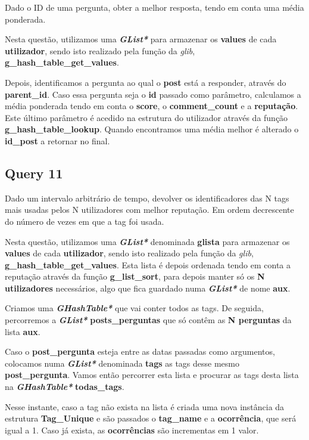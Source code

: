 \documentclass[a4paper]{article}
\begin{document}
Dado o ID de uma pergunta, obter a melhor resposta, tendo em conta
uma média ponderada.

Nesta questão, utilizamos uma \textit{\textbf{GList*}} para armazenar 
os \textbf{values} de cada \textbf{utilizador}, sendo isto realizado
pela função da \textit{glib}, \textbf{g\_hash\_table\_get\_values}.

Depois, identificamos a pergunta ao qual o \textbf{post} está a responder,
através do \textbf{parent\_id}. Caso essa pergunta seja o \textbf{id}
passado como parâmetro, calculamos a média ponderada tendo em conta o
\textbf{score}, o \textbf{comment\_count} e a \textbf{reputação}. Este
último parâmetro é acedido na estrutura do utilizador através da função
\textbf{g\_hash\_table\_lookup}. Quando encontramos uma média melhor é
alterado o \textbf{id\_post} a retornar no final.

\subsection{Query 11}

Dado um intervalo arbitrário de tempo, devolver os identificadores das N tags
mais usadas pelos N utilizadores com melhor reputação. Em ordem decrescente 
do número de vezes em que a tag foi usada.

Nesta questão, utilizamos uma \textit{\textbf{GList*}} denominada 
\textbf{glista} para armazenar os \textbf{values} de cada \textbf{utilizador},
sendo isto realizado pela função da \textit{glib}, 
\textbf{g\_hash\_table\_get\_values}. Esta lista é depois ordenada tendo em
conta a reputação através da função \textbf{g\_list\_sort}, para depois 
manter só os \textbf{N utilizadores} necessários, algo que fica guardado
numa \textit{\textbf{GList*}} de nome \textbf{aux}.

Criamos uma \textit{\textbf{GHashTable*}} que vai conter todos as tags.
De seguida, percorremos a \textit{\textbf{GList*}} \textbf{posts\_perguntas}
que só contêm as \textbf{N perguntas} da lista \textbf{aux}.

Caso o \textbf{post\_pergunta} esteja entre as datas passadas como argumentos,
colocamos numa \textit{\textbf{GList*}} denominada \textbf{tags} as tags desse
mesmo \textbf{post\_pergunta}. Vamos então percorrer esta lista e procurar
as tags desta lista na \textit{\textbf{GHashTable*}} \textbf{todas\_tags}.

Nesse instante, caso a tag não exista na lista é criada uma nova instância
da estrutura \textbf{Tag\_Unique} e são passados o \textbf{tag\_name} e
a \textbf{ocorrência}, que será igual a 1. Caso já exista, as 
\textbf{ocorrências} são incrementas em 1 valor.
\end{document}
